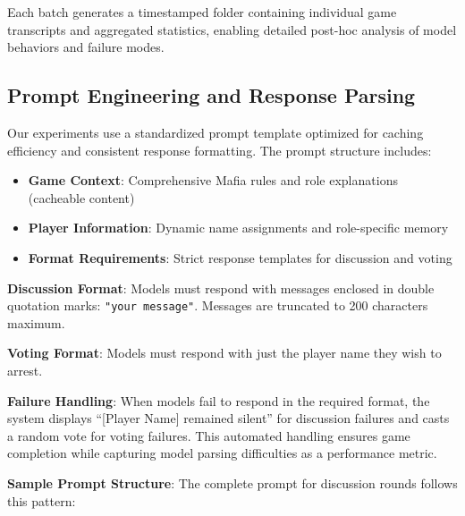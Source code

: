 \documentclass{article}
\begin{document}
Each batch generates a timestamped folder containing individual game transcripts and aggregated statistics, enabling detailed post-hoc analysis of model behaviors and failure modes.

\subsection{Prompt Engineering and Response Parsing}

Our experiments use a standardized prompt template optimized for caching efficiency and consistent response formatting. The prompt structure includes:

\begin{itemize}
    \item \textbf{Game Context}: Comprehensive Mafia rules and role explanations (cacheable content)
    \item \textbf{Player Information}: Dynamic name assignments and role-specific memory
    \item \textbf{Format Requirements}: Strict response templates for discussion and voting
\end{itemize}

\textbf{Discussion Format}: Models must respond with messages enclosed in double quotation marks: \texttt{"your message"}. Messages are truncated to 200 characters maximum.

\textbf{Voting Format}: Models must respond with just the player name they wish to arrest.

\textbf{Failure Handling}: When models fail to respond in the required format, the system displays ``[Player Name] remained silent'' for discussion failures and casts a random vote for voting failures. This automated handling ensures game completion while capturing model parsing difficulties as a performance metric.

\textbf{Sample Prompt Structure}: The complete prompt for discussion rounds follows this pattern:
\end{document}
